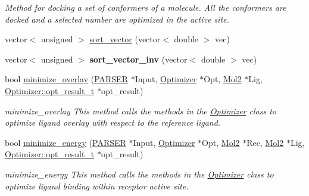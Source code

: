 \begin{DoxyCompactItemize}
\begin{DoxyCompactList}\small\item\em Method for docking a set of conformers of a molecule. All the conformers are docked and a selected number are optimized in the active site. \item\end{DoxyCompactList}\item 
vector$<$ unsigned $>$ \hyperlink{classDocker_aa0927d334d8b68434c293c13db7e03cc}{sort\_\-vector} (vector$<$ double $>$ vec)
\item 
\hypertarget{classDocker_afa90a10b668435955d5fbb898869f718}{
vector$<$ unsigned $>$ {\bfseries sort\_\-vector\_\-inv} (vector$<$ double $>$ vec)}
\label{classDocker_afa90a10b668435955d5fbb898869f718}

\item 
bool \hyperlink{classDocker_a834f5873f6b323033b5060e46e20b4f9}{minimize\_\-overlay} (\hyperlink{classPARSER}{PARSER} $\ast$Input, \hyperlink{classOptimizer}{Optimizer} $\ast$Opt, \hyperlink{classMol2}{Mol2} $\ast$Lig, \hyperlink{structOptimizer_1_1opt__result__t}{Optimizer::opt\_\-result\_\-t} $\ast$opt\_\-result)
\begin{DoxyCompactList}\small\item\em minimize\_\-overlay This method calls the methods in the \hyperlink{classOptimizer}{Optimizer} class to optimize ligand overlay with respect to the reference ligand. \item\end{DoxyCompactList}\item 
bool \hyperlink{classDocker_a13bf6c4b63f4338d891210c4d6d767df}{minimize\_\-energy} (\hyperlink{classPARSER}{PARSER} $\ast$Input, \hyperlink{classOptimizer}{Optimizer} $\ast$Opt, \hyperlink{classMol2}{Mol2} $\ast$Rec, \hyperlink{classMol2}{Mol2} $\ast$Lig, \hyperlink{structOptimizer_1_1opt__result__t}{Optimizer::opt\_\-result\_\-t} $\ast$opt\_\-result)
\begin{DoxyCompactList}\small\item\em minimize\_\-energy This method calls the methods in the \hyperlink{classOptimizer}{Optimizer} class to optimize ligand binding within receptor active site. \item\end{DoxyCompactList}\end{DoxyCompactItemize}
